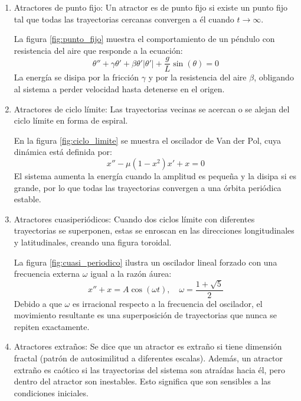 \begin{enumerate}
	
	\item Atractores de punto fijo: Un atractor es de punto fijo si existe un punto fijo tal que todas las trayectorias cercanas convergen a él cuando $t \to \infty$.

	La figura \ref{fig:punto_fijo} muestra el comportamiento de un péndulo con resistencia del aire que responde a la ecuación:
	\begin{equation*}
		\theta'' + \gamma \theta' + \beta \theta' |\theta'| + \frac{g}{L} \sin(\theta) = 0
	\end{equation*}
	La energía se disipa por la fricción $\gamma$ y por la resistencia del aire $\beta$, obligando al sistema a perder velocidad hasta detenerse en el origen.

	\item Atractores de ciclo límite: Las trayectorias vecinas se acercan o se alejan del ciclo límite en forma de espiral. 
	
	En la figura \ref{fig:ciclo_limite} se muestra el oscilador de Van der Pol, cuya dinámica está definida por:
	\begin{equation*}
		x'' - \mu (1 - x^2) x' + x = 0
	\end{equation*}
	El sistema aumenta la energía cuando la amplitud es pequeña y la disipa si es grande, por lo que todas las trayectorias convergen a una órbita periódica estable. 
	
	\item Atractores cuasiperiódicos: Cuando dos ciclos límite con diferentes trayectorias se superponen, estas se enroscan en las direcciones longitudinales y latitudinales, creando una figura toroidal.
	
	La figura \ref{fig:cuasi_periodico} ilustra un oscilador lineal forzado con una frecuencia externa $\omega$ igual a la razón áurea:
	\begin{equation*}
		x'' + x = A \cos(\omega t), \quad \omega = \frac{1 + \sqrt{5}}{2}
	\end{equation*}
	Debido a que $\omega$ es irracional respecto a la frecuencia del oscilador, el movimiento resultante es una superposición de trayectorias que nunca se repiten exactamente.
	
	\item Atractores extraños: Se dice que un atractor es extraño si tiene dimensión fractal (patrón de autosimilitud a diferentes escalas). Además, un atractor extraño es caótico si las trayectorias del sistema son atraídas hacia él, pero dentro del atractor son inestables. Esto significa que son sensibles a las condiciones iniciales.
	

\end{enumerate}
